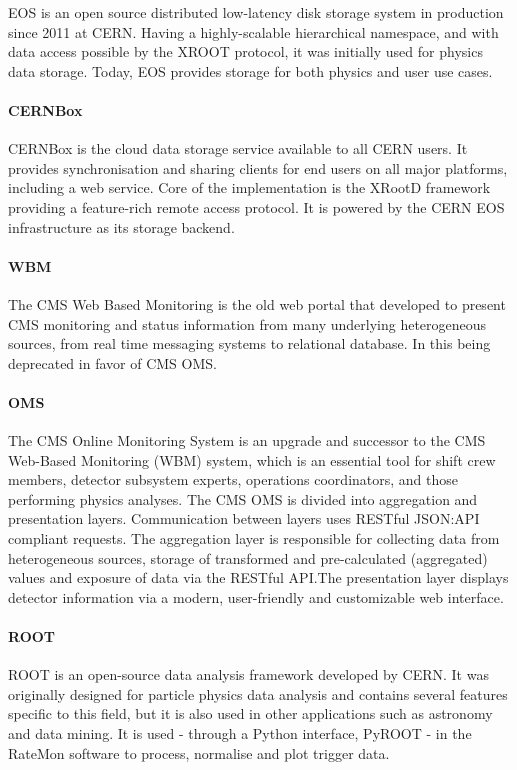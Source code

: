 EOS \cite{Peters_2015} is an open source distributed low-latency disk storage system in production since 2011 at CERN. Having a highly-scalable hierarchical namespace, and with data access possible by the XROOT protocol, it was initially used for physics data storage. Today, EOS provides storage for both physics and user use cases.

\paragraph{CERNBox}

CERNBox \cite{Mascetti_2015} is the cloud data storage service available to all CERN users. It provides synchronisation and sharing clients for end users on all major platforms, including a web service. Core of the implementation is the XRootD framework providing a feature-rich remote access protocol. It is powered by the CERN EOS infrastructure as its storage backend.

\paragraph{WBM} The CMS Web Based Monitoring \cite{badgett2014web} is the old web portal that developed to present CMS monitoring and status information from many underlying heterogeneous sources, from real time messaging systems to relational database. In this being deprecated in favor of CMS OMS.

\paragraph{OMS} The CMS Online Monitoring System \cite{Andre2649402} is an upgrade and successor to the CMS Web-Based Monitoring (WBM) system, which is an essential tool for shift crew members, detector subsystem experts, operations coordinators, and those performing physics analyses. The CMS OMS is divided into aggregation and presentation layers. Communication between layers uses RESTful JSON:API compliant requests. The aggregation layer is responsible for collecting data from heterogeneous sources, storage of transformed and pre-calculated (aggregated) values and exposure of data via the RESTful API.The presentation layer displays detector information via a modern, user-friendly and customizable web interface.

\paragraph{ROOT} ROOT \cite{Brun:1997pa} is an open-source data analysis framework developed by CERN. It was originally designed for particle physics data analysis and contains several features specific to this field, but it is also used in other applications such as astronomy and data mining. It is used - through a Python interface, PyROOT \cite{PythoninterfacePyROOTROOT-2020-10-02} - in the RateMon software to process, normalise and plot trigger data.



